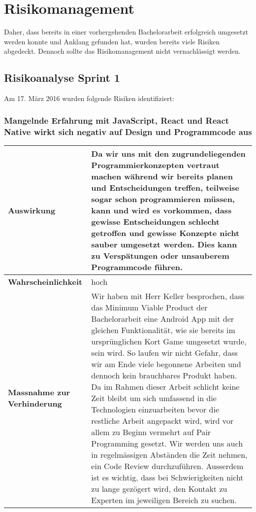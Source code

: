 \section{Risikomanagement}
Daher, dass  \kort{} bereits in einer vorhergehenden Bachelorarbeit erfolgreich umgesetzt werden konnte und Anklang gefunden hat, wurden bereits viele Risiken abgedeckt.\newline
Dennoch sollte das Risikomanagement nicht vernachlässigt werden.

\subsection{Risikoanalyse Sprint 1}
Am 17. März 2016 wurden folgende Risiken identifiziert:

\subsubsection{Mangelnde Erfahrung mit JavaScript, React und React Native wirkt sich negativ auf Design und Programmcode aus}
\begin{table}[H]
\centering
\begin{tabular}{|p{0.25\twocelltabwidth}|p{0.75\twocelltabwidth}|}
\hline 
\small{\textbf{Auswirkung}} & Da wir uns mit den zugrundeliegenden Programmierkonzepten vertraut machen während wir bereits planen und Entscheidungen treffen, teilweise sogar schon programmieren müssen, kann und wird es vorkommen, dass gewisse Entscheidungen schlecht getroffen und gewisse Konzepte nicht sauber umgesetzt werden. 
Dies kann zu Verspätungen oder unsauberem Programmcode führen. \\
\hline 
\small{\textbf{Wahrscheinlichkeit}} & hoch \\
\hline 
\small{\textbf{Massnahme zur Verhinderung}} & Wir haben mit Herr Keller besprochen, dass das \gls{Minimum Viable Product} der Bachelorarbeit eine Android App mit der gleichen Funktionalität, wie sie bereits im ursprünglichen Kort Game umgesetzt wurde, sein wird.
So laufen wir nicht Gefahr, dass wir am Ende viele begonnene Arbeiten und dennoch kein brauchbares Produkt haben.\newline
Da im Rahmen dieser Arbeit schlicht keine Zeit bleibt um sich umfassend in die Technologien einzuarbeiten bevor die restliche Arbeit angepackt wird, wird vor allem zu Beginn vermehrt auf \gls{Pair Programming} gesetzt.
Wir werden uns auch in regelmässigen Abständen die Zeit nehmen, ein Code Review durchzuführen.
Ausserdem ist es wichtig, dass bei Schwierigkeiten nicht zu lange gezögert wird, den Kontakt zu Experten im jeweiligen Bereich zu suchen. \\
\hline
\end{tabular}
\end{table}

